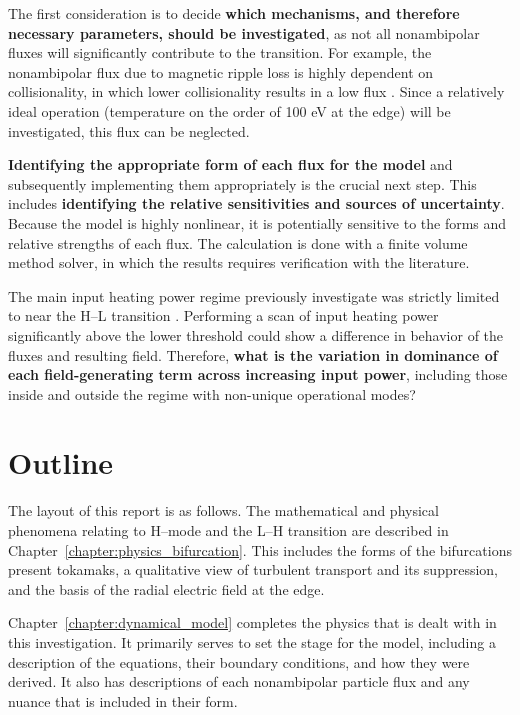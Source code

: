 The first consideration is to decide \textbf{which mechanisms, and therefore necessary parameters, should be investigated}, as not all nonambipolar fluxes will significantly contribute to the transition.
For example, the nonambipolar flux due to magnetic ripple loss is highly dependent on collisionality, in which lower collisionality results in a low flux \cite{stringer_effect_1972}.
Since a relatively ideal operation (temperature on the order of 100 eV at the edge) will be investigated, this flux can be neglected.

\textbf{Identifying the appropriate form of each flux for the model} and subsequently implementing them appropriately is the crucial next step.
This includes \textbf{identifying the relative sensitivities and sources of uncertainty}.
Because the model is highly nonlinear, it is potentially sensitive to the forms and relative strengths of each flux.
The calculation is done with a finite volume method solver, in which the results requires verification with the literature.

The main input heating power regime previously investigate was strictly limited to near the H--L transition \cite{staps_backstepping_2017}.
Performing a scan of input heating power significantly above the lower threshold could show a difference in behavior of the fluxes and resulting field.
Therefore, \textbf{what is the variation in dominance of each field-generating term across increasing input power}, including those inside and outside the regime with non-unique operational modes?

\section{Outline}\label{sec:outline}
The layout of this report is as follows.
The mathematical and physical phenomena relating to H--mode and the L--H transition are described in Chapter~\ref{chapter:physics_bifurcation}.
This includes the forms of the bifurcations present tokamaks, a qualitative view of turbulent transport and its suppression, and the basis of the radial electric field at the edge.

Chapter~\ref{chapter:dynamical_model} completes the physics that is dealt with in this investigation.
It primarily serves to set the stage for the model, including a description of the equations, their boundary conditions, and how they were derived.
It also has descriptions of each nonambipolar particle flux and any nuance that is included in their form.

